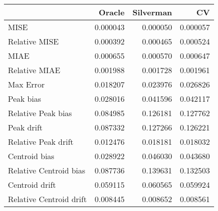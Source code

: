 \begin{tabular}{lrrr}
  \hline
 & Oracle & Silverman & CV \\ 
  \hline
MISE & 0.000043 & 0.000050 & 0.000057 \\ 
  Relative MISE & 0.000392 & 0.000465 & 0.000524 \\ 
  MIAE & 0.000655 & 0.000570 & 0.000647 \\ 
  Relative MIAE & 0.001988 & 0.001728 & 0.001961 \\ 
  Max Error & 0.018207 & 0.023976 & 0.026826 \\ 
  Peak bias & 0.028016 & 0.041596 & 0.042117 \\ 
  Relative Peak bias & 0.084985 & 0.126181 & 0.127762 \\ 
  Peak drift & 0.087332 & 0.127266 & 0.126221 \\ 
  Relative Peak drift & 0.012476 & 0.018181 & 0.018032 \\ 
  Centroid bias & 0.028922 & 0.046030 & 0.043680 \\ 
  Relative Centroid bias & 0.087736 & 0.139631 & 0.132503 \\ 
  Centroid drift & 0.059115 & 0.060565 & 0.059924 \\ 
  Relative Centroid drift & 0.008445 & 0.008652 & 0.008561 \\ 
   \hline
\end{tabular}
